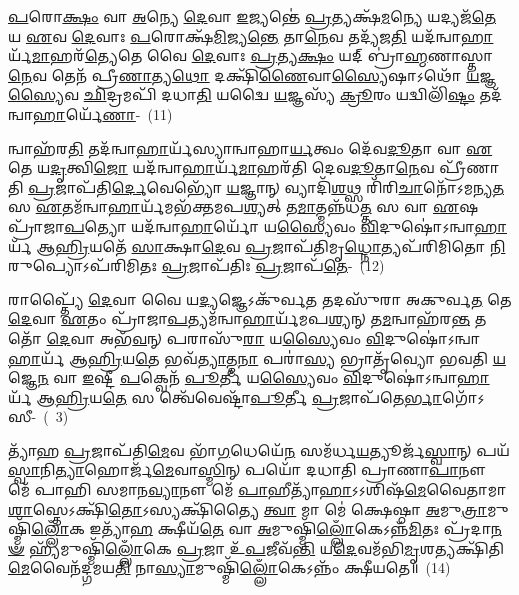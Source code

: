 {\anuvakamend[{𑌗𑍗𑌰𑍍𑌵𑌾 𑌅᳴\-\ul{𑌸𑍍𑌯𑍈} 𑌤𑌤𑍍 𑌪𑍍𑌰᳴\-\ul{𑌤𑌿}\-𑌷𑍍𑌠𑌾\-𑌽𑌹𑍍𑌵᳴\-\ul{𑌥𑌾} 𑌇𑌤𑌿᳴ 𑌵𑌿𑍞\-\ul{𑌶}\-𑌤𑌿𑌶𑍍𑌚᳴}]}%

\-\ul{𑌪}\-𑌰𑍋\-\ul{𑌕𑍍𑌷𑌂} 𑌵𑌾 \ul{𑌅}\-𑌨𑍍𑌯𑍇 \ul{𑌦𑍇}\-𑌵𑌾 \ul{𑌇}\-𑌜𑍍𑌯𑌨𑍍𑌤𑍇॑ \ul{𑌪𑍍𑌰}\-𑌤𑍍𑌯𑌕𑍍𑌷᳴\-\ul{𑌮}\-𑌨𑍍𑌯𑍇 𑌯𑌦𑍍𑌯𑌜᳴\-\ul{𑌤𑍇} 𑌯 \ul{𑌏}\-𑌵 \ul{𑌦𑍇}\-𑌵𑌾𑌃 \ul{𑌪}\-𑌰𑍋𑌕𑍍𑌷᳴\-\ul{𑌮𑌿}\-𑌜𑍍𑌯\-\ul{𑌨𑍍𑌤𑍇} 𑌤𑌾\-\ul{𑌨𑍇}\-𑌵 𑌤𑌦𑍍𑌯᳴𑌜\-\ul{𑌤𑌿} 𑌯𑌦᳴𑌨𑍍𑌵𑌾\-\ul{𑌹𑌾}\-𑌰𑍍𑌯᳴\-\ul{𑌮𑌾}\-𑌹𑌰᳴\-\ul{𑌤𑍍𑌯𑍇}\-𑌤𑍇 𑌵𑍈 \ul{𑌦𑍇}\-𑌵𑌾𑌃 \ul{𑌪𑍍𑌰}\-𑌤𑍍𑌯\-\ul{𑌕𑍍𑌷𑌂} 𑌯𑌦𑍍 𑌬𑍍𑌰𑌾॑\-\ul{𑌹𑍍𑌮}\-𑌣𑌾𑌸𑍍𑌤𑌾\-\ul{𑌨𑍇}\-𑌵 𑌤𑍇𑌨᳴ 𑌪𑍍𑌰𑍀\-\ul{𑌣𑌾}\-𑌤𑍍𑌯\-\ul{𑌥𑍋} 𑌦𑌕𑍍𑌷𑌿᳴\-\ul{𑌣𑍈}\-𑌵𑌾\-\ul{𑌸𑍍𑌯𑍈}\-𑌷𑌾\-𑌽𑌥𑍋᳴ \ul{𑌯}\-𑌜𑍍𑌞\-\ul{𑌸𑍍𑌯𑍈}\-𑌵 \ul{𑌛𑌿}\-𑌦𑍍𑌰𑌮𑌪𑌿᳴ 𑌦𑌧𑌾\-\ul{𑌤𑌿} 𑌯𑌦𑍍𑌵𑍈 \ul{𑌯}\-𑌜𑍍𑌞𑌸𑍍𑌯᳴ \ul{𑌕𑍍𑌰𑍂}\-𑌰𑌂 𑌯𑌦𑍍𑌵𑌿𑌲𑌿᳴\-\ul{𑌷𑍍𑌟𑌂} 𑌤𑌦᳴𑌨𑍍𑌵𑌾\-\ul{𑌹𑌾}\-𑌰𑍍𑌯𑍇᳴\-\ul{𑌣𑌾}\--~(11)

𑌨𑍍𑌵𑌾𑌹᳴𑌰\-\ul{𑌤𑌿} 𑌤𑌦᳴𑌨𑍍𑌵𑌾\-\ul{𑌹𑌾}\-𑌰𑍍𑌯᳴𑌸𑍍𑌯𑌾𑌨𑍍𑌵𑌾𑌹𑌾\-\ul{𑌰𑍍𑌯}\-𑌤𑍍𑌵𑌂 𑌦𑍇᳴𑌵\-\ul{𑌦𑍂}\-𑌤𑌾 𑌵𑌾 \ul{𑌏}\-𑌤𑍇 𑌯\-\ul{𑌦𑍃}\-𑌤𑍍𑌵𑌿\-\ul{𑌜𑍋} 𑌯𑌦᳴𑌨𑍍𑌵𑌾\-\ul{𑌹𑌾}\-𑌰𑍍𑌯᳴\-\ul{𑌮𑌾}\-𑌹𑌰᳴𑌤𑌿 𑌦𑍇𑌵\-\ul{𑌦𑍂}\-𑌤𑌾\-\ul{𑌨𑍇}\-𑌵 𑌪𑍍𑌰𑍀᳴𑌣𑌾𑌤𑌿 \ul{𑌪𑍍𑌰}\-𑌜𑌾𑌪᳴𑌤𑌿\-\ul{𑌰𑍍𑌦𑍇}\-𑌵𑍇𑌭𑍍𑌯𑍋᳴ \ul{𑌯}\-𑌜𑍍𑌞𑌾𑌨𑍍 𑌵𑍍𑌯𑌾𑌦𑌿᳴\-\ul{𑌶}\-𑌥𑍍𑌸 𑌰𑌿᳴𑌰𑌿\-\ul{𑌚𑌾}\-𑌨𑍋᳴\-𑌽𑌮𑌨𑍍𑌯\-\ul{𑌤} 𑌸 \ul{𑌏}\-𑌤𑌮᳴𑌨𑍍𑌵𑌾\-\ul{𑌹𑌾}\-𑌰𑍍𑌯᳴𑌮𑌭᳴𑌕𑍍𑌤𑌮𑌪\-\ul{𑌶𑍍𑌯}\-𑌤𑍍 𑌤\-\ul{𑌮𑌾}\-𑌤𑍍𑌮𑌨𑍍𑌨᳴𑌧\-\ul{𑌤𑍍𑌤} 𑌸 𑌵𑌾 \ul{𑌏}\-𑌷 𑌪𑍍𑌰𑌾᳴𑌜𑌾\-\ul{𑌪}\-𑌤𑍍𑌯𑍋 𑌯𑌦᳴𑌨𑍍𑌵𑌾\-\ul{𑌹𑌾}\-𑌰𑍍𑌯𑍋᳴ 𑌯\-\ul{𑌸𑍍𑌯𑍈}\-𑌵𑌂 \ul{𑌵𑌿}\-𑌦𑍁𑌷𑍋॑\-𑌽𑌨𑍍𑌵𑌾\-\ul{𑌹𑌾}\-𑌰𑍍𑌯᳴ 𑌆\-\ul{𑌹𑍍𑌰𑌿}\-𑌯𑌤𑍇᳴ \ul{𑌸𑌾}\-𑌕𑍍𑌷𑌾\-\ul{𑌦𑍇}\-𑌵 \ul{𑌪𑍍𑌰}\-𑌜𑌾𑌪᳴𑌤𑌿𑌮𑍃\-\ul{𑌧𑍍𑌨𑍋}\-𑌤𑍍𑌯𑌪᳴𑌰𑌿𑌮𑌿𑌤𑍋 \ul{𑌨𑌿}\-𑌰𑍁𑌪𑍍𑌯𑍋\-𑌽𑌪᳴𑌰𑌿𑌮𑌿𑌤𑌃 \ul{𑌪𑍍𑌰}\-𑌜𑌾𑌪᳴𑌤𑌿𑌃 \ul{𑌪𑍍𑌰}\-𑌜𑌾𑌪᳴\-\ul{𑌤𑍇}\--~(12)

𑌰𑌾𑌪𑍍𑌤𑍍𑌯𑍈᳴ \ul{𑌦𑍇}\-𑌵𑌾 𑌵𑍈 𑌯\-\ul{𑌦𑍍𑌯}\-𑌜𑍍𑌞𑍇\-𑌽𑌕𑍁᳴𑌰𑍍𑌵\-\ul{𑌤} 𑌤𑌦𑌸𑍁᳴𑌰𑌾 𑌅𑌕𑍁𑌰𑍍𑌵\-\ul{𑌤} 𑌤𑍇 \ul{𑌦𑍇}\-𑌵𑌾 \ul{𑌏}\-𑌤𑌂 𑌪𑍍𑌰𑌾᳴𑌜𑌾\-\ul{𑌪}\-𑌤𑍍𑌯𑌮᳴𑌨𑍍𑌵𑌾\-\ul{𑌹𑌾}\-𑌰𑍍𑌯᳴𑌮𑌪\-\ul{𑌶𑍍𑌯}\-𑌨𑍍 𑌤\-\ul{𑌮}\-𑌨𑍍𑌵𑌾𑌹᳴𑌰\-\ul{𑌨𑍍𑌤} 𑌤𑌤𑍋᳴ \ul{𑌦𑍇}\-𑌵𑌾 𑌅𑌭᳴\-\ul{𑌵}\-𑌨𑍍 𑌪𑌰𑌾𑌸𑍁᳴\-\ul{𑌰𑌾} 𑌯\-\ul{𑌸𑍍𑌯𑍈}\-𑌵𑌂 \ul{𑌵𑌿}\-𑌦𑍁𑌷𑍋॑\-𑌽𑌨𑍍𑌵𑌾\-\ul{𑌹𑌾}\-𑌰𑍍𑌯᳴ 𑌆\-\ul{𑌹𑍍𑌰𑌿}\-𑌯\-\ul{𑌤𑍇} 𑌭𑌵᳴\-\ul{𑌤𑍍𑌯𑌾}\-𑌤𑍍𑌮\-\ul{𑌨𑌾} 𑌪𑌰𑌾॑\-\ul{𑌸𑍍𑌯} 𑌭𑍍𑌰𑌾𑌤𑍃᳴𑌵𑍍𑌯𑍋 𑌭𑌵𑌤𑌿 \ul{𑌯}\-𑌜𑍍𑌞𑍇\-\ul{𑌨} 𑌵𑌾 \ul{𑌇}\-𑌷𑍍𑌟𑍀 \ul{𑌪}\-𑌕𑍍𑌵𑍇𑌨᳴ \ul{𑌪𑍂}\-𑌰𑍍𑌤𑍀 𑌯\-\ul{𑌸𑍍𑌯𑍈}\-𑌵𑌂 \ul{𑌵𑌿}\-𑌦𑍁𑌷𑍋॑\-𑌽𑌨𑍍𑌵𑌾\-\ul{𑌹𑌾}\-𑌰𑍍𑌯᳴ 𑌆\-\ul{𑌹𑍍𑌰𑌿}\-𑌯\-\ul{𑌤𑍇} 𑌸 𑌤𑍍𑌵𑍇᳴𑌵𑍇𑌷𑍍𑌟𑌾᳴\-\ul{𑌪𑍂}\-𑌰𑍍𑌤𑍀 \ul{𑌪𑍍𑌰}\-𑌜𑌾𑌪᳴𑌤𑍇\-\ul{𑌰𑍍𑌭𑌾}\-𑌗𑍋᳴\-\mbox{𑌽𑌸𑍀-~(~3)}

𑌤𑍍𑌯𑌾᳴𑌹 \ul{𑌪𑍍𑌰}\-𑌜𑌾𑌪᳴𑌤𑌿\-\ul{𑌮𑍇}\-𑌵 𑌭𑌾᳴\-\ul{𑌗}\-𑌧𑍇𑌯𑍇᳴\-\ul{𑌨} 𑌸𑌮᳴𑌰𑍍𑌧\-\ul{𑌯}\-𑌤𑍍𑌯𑍂𑌰𑍍𑌜᳴\-\ul{𑌸𑍍𑌵𑌾}\-𑌨𑍍 𑌪𑌯᳴\-\ul{𑌸𑍍𑌵𑌾}\-𑌨𑌿\-\ul{𑌤𑍍𑌯𑌾}\-𑌹𑍋𑌰𑍍𑌜᳴\-\ul{𑌮𑍇}\-𑌵𑌾\-\ul{𑌸𑍍𑌮𑌿}\-𑌨𑍍 𑌪𑌯𑍋᳴ 𑌦𑌧𑌾𑌤𑌿 𑌪𑍍𑌰𑌾𑌣𑌾\-\ul{𑌪𑌾}\-𑌨𑍗 𑌮𑍇᳴ 𑌪𑌾𑌹𑌿 𑌸𑌮𑌾𑌨\-\ul{𑌵𑍍𑌯𑌾}\-𑌨𑍗 𑌮𑍇᳴ \ul{𑌪𑌾}\-𑌹𑍀𑌤𑍍𑌯𑌾᳴\-\ul{𑌹𑌾}\-\-𑌽\-𑌽𑌶𑌿𑌷᳴\-\ul{𑌮𑍇}\-𑌵𑍈𑌤𑌾𑌮𑌾 \ul{𑌶𑌾}\-𑌸𑍍𑌤𑍇\-𑌽𑌕𑍍𑌷𑌿᳴\-\ul{𑌤𑍋}\-\-𑌽𑌸𑍍𑌯𑌕𑍍𑌷𑌿᳴𑌤𑍍𑌯𑍈 \ul{𑌤𑍍𑌵𑌾} 𑌮𑌾 𑌮𑍇॑ 𑌕𑍍𑌷𑍇𑌷𑍍𑌠𑌾 \ul{𑌅}\-𑌮𑍁\-\ul{𑌤𑍍𑌰𑌾}\-𑌮𑍁𑌷𑍍𑌮𑌿᳴\-\ul{𑌲𑍍𑌲𑍋𑌁}\-𑌕 𑌇𑌤𑍍𑌯𑌾᳴\-\ul{𑌹} 𑌕𑍍𑌷𑍀𑌯᳴\-\ul{𑌤𑍇} 𑌵𑌾 \ul{𑌅}\-𑌮𑍁𑌷𑍍𑌮𑌿᳴\-\ul{𑌲𑍍𑌲𑍋𑌁}\-𑌕𑍇\-𑌽𑌨𑍍𑌨᳴\-\ul{𑌮𑌿}\-𑌤𑌃 𑌪𑍍𑌰᳴𑌦𑌾\-\ul{𑌨}\-\-\ul{𑍟} 𑌹𑍍𑌯᳴𑌮𑍁𑌷𑍍𑌮𑌿᳴\-\ul{𑌲𑍍𑌲𑍋𑌁}\-𑌕𑍇 \ul{𑌪𑍍𑌰}\-𑌜𑌾 𑌉᳴\-\ul{𑌪}\-𑌜𑍀𑌵᳴\-\ul{𑌨𑍍𑌤𑌿} 𑌯\-\ul{𑌦𑍇}\-𑌵𑌮᳴𑌭𑌿\-\ul{𑌮𑍃}\-𑌶𑌤𑍍𑌯𑌕𑍍𑌷𑌿᳴𑌤𑌿\-\ul{𑌮𑍇}\-𑌵𑍈𑌨᳴𑌦𑍍𑌗𑌮𑌯\-\ul{𑌤𑌿} 𑌨𑌾\-\ul{𑌸𑍍𑌯𑌾}\-𑌮𑍁𑌷𑍍𑌮𑌿᳴\-\ul{𑌲𑍍𑌲𑍋𑌁}\-𑌕𑍇\-𑌽𑌨𑍍𑌨𑌂᳴ 𑌕𑍍𑌷𑍀𑌯𑌤𑍇॥~(14)

